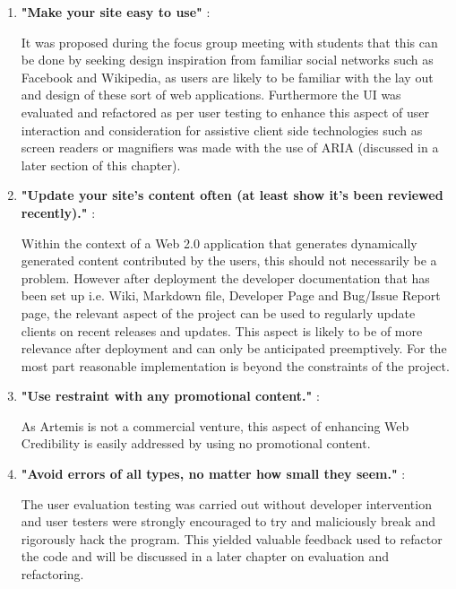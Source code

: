 \begin{enumerate}
    \item \textbf{"Make your site easy to use"} \cite{Fogg2002a}:
    
    It was proposed during the focus group meeting with students that this can be done by seeking design inspiration from familiar social networks such as Facebook and Wikipedia, as users are likely to be familiar with the lay out and design of these sort of web applications\cite{Fogg2002a}. Furthermore the UI was evaluated and refactored as per user testing to enhance this aspect of user interaction and consideration  for assistive client side technologies such as screen readers or magnifiers was made with the use of ARIA (discussed in a later section of this chapter).
    
    \item \textbf{"Update your site's content often (at least show it's been reviewed recently)."} \cite{Fogg2002a}:
    
    Within the context of a Web 2.0 application that generates dynamically generated content contributed by the users, this should not necessarily be a problem. However after deployment the developer documentation that has been set up i.e. Wiki, Markdown file, Developer Page and Bug/Issue Report page, the relevant aspect of the project can be used to regularly update clients on recent releases and updates. This aspect is likely to be of more relevance after deployment and can only be anticipated preemptively. For the most part reasonable implementation is beyond the constraints of the project.
    
    \item \textbf{"Use restraint with any promotional content."} \cite{Fogg2002a}:
    
    As Artemis is not a commercial venture, this aspect of enhancing Web Credibility is easily addressed by using no promotional content.
    
    \item \textbf{"Avoid errors of all types, no matter how small they seem."} \cite{Fogg2002a}:
    
    The user evaluation testing was carried out without developer intervention and user testers were strongly encouraged to try and maliciously break and rigorously hack the program. This yielded valuable feedback used to refactor the code and will be discussed in a later chapter on evaluation and refactoring.
    
\end{enumerate}
\newpage



